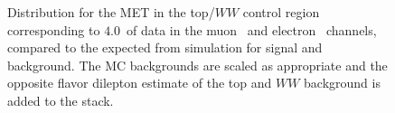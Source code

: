 \begin{figure}[!hbtp]
\begin{center}
\caption{Distribution for the MET in the top/$WW$ control region corresponding 
to $4.0$~\ifb of data in the muon~ and electron~ channels, 
compared to the expected from simulation for signal and background. The MC backgrounds are scaled as 
appropriate and the opposite flavor dilepton estimate of the top and $WW$ background is added to the stack.}
\label{fig:topww_metlog}
\end{center}
\end{figure}

